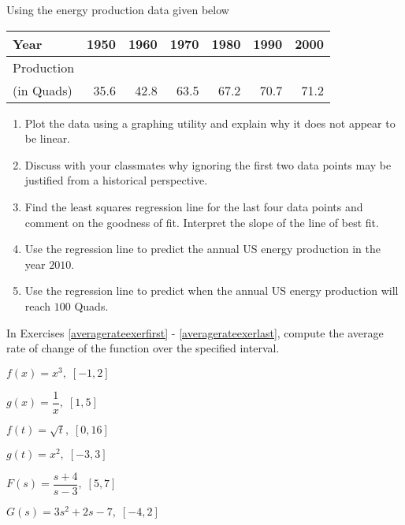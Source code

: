 \begin{exenum}

\item Using the energy production data given below

\medskip
\noindent \begin{tabular}{|l|r|r|r|r|r|r|} \hline
Year & 1950 & 1960 & 1970 & 1980 & 1990 & 2000 \\
\hline
Production & & & & & & \\
(in Quads) & 35.6 & 42.8 & 63.5 & 67.2 & 70.7 & 71.2 \\ \hline
\end{tabular}
\medskip

\begin{enumerate}

\item  Plot the data using a graphing utility and explain why it does not appear to be linear.

\item  Discuss with your classmates why ignoring the first two data points may be justified from a historical perspective.

\item Find the least squares regression line for the last four data points and comment on the goodness of fit. Interpret the slope of the line of best fit.

\item  Use the regression line to predict the annual US energy production in the year $2010$.

\item  Use the regression line to predict when the annual US energy production will reach $100$ Quads.

\end{enumerate}

\end{exenum}

In Exercises \ref{averagerateexerfirst} - \ref{averagerateexerlast}, compute the average rate of change of the  function over the specified interval.

\begin{shortexenum}

\item $f(x) = x^{3}, \; [-1, 2]$  \label{averagerateexerfirst}
\item $g(x) = \dfrac{1}{x}, \; [1, 5]$

\item $f(t) = \sqrt{t}, \; [0, 16]$
\item $g(t) = x^{2}, \; [-3, 3]$

\item $F(s) = \dfrac{s + 4}{s - 3}, \; [5, 7]$
\item $G(s) = 3s^{2} + 2s - 7, \; [-4, 2]$  \label{averagerateexerlast}

\end{shortexenum}

